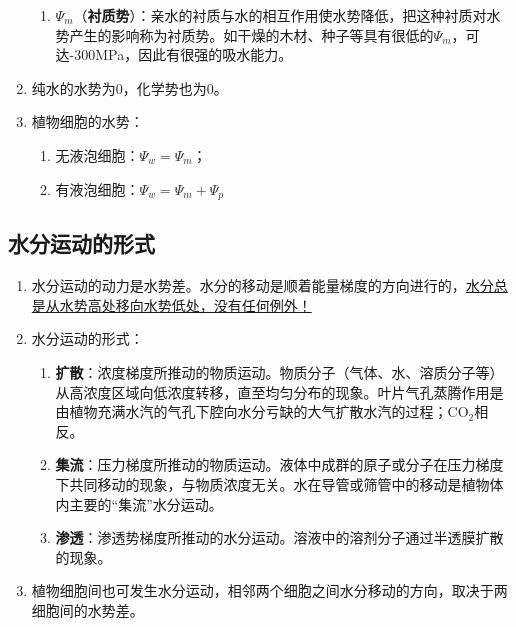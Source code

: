 \begin{enumerate}
\begin{enumerate}
        \item $\Psi_m$（\textbf{衬质势}）：亲水的衬质与水的相互作用使水势降低，把这种衬质对水势产生的影响称为衬质势。如干燥的木材、种子等具有很低的$\Psi_m$，可达-300MPa，因此有很强的吸水能力。
    \end{enumerate}
    \item 纯水的水势为0，化学势也为0。
    \item 植物细胞的水势：
    \begin{enumerate}
        \item 无液泡细胞：$\Psi_w=\Psi_m$；
        \item 有液泡细胞：$\Psi_w=\Psi_m+\Psi_p$
    \end{enumerate}
\end{enumerate}

\subsection{水分运动的形式}
\begin{enumerate}
    \item 水分运动的动力是水势差。水分的移动是顺着能量梯度的方向进行的，\uline{水分总是从水势高处移向水势低处，没有任何例外！}
    \item 水分运动的形式：
    \begin{enumerate}
        \item \textbf{扩散}：浓度梯度所推动的物质运动。物质分子（气体、水、溶质分子等）从高浓度区域向低浓度转移，直至均匀分布的现象。叶片气孔蒸腾作用是由植物充满水汽的气孔下腔向水分亏缺的大气扩散水汽的过程；CO$_2$相反。
        \item \textbf{集流}：压力梯度所推动的物质运动。液体中成群的原子或分子在压力梯度下共同移动的现象，与物质浓度无关。水在导管或筛管中的移动是植物体内主要的“集流”水分运动。
        \item \textbf{渗透}：渗透势梯度所推动的水分运动。溶液中的溶剂分子通过半透膜扩散的现象。
    \end{enumerate}
    \item 植物细胞间也可发生水分运动，相邻两个细胞之间水分移动的方向，取决于两细胞间的水势差。
\end{enumerate}
